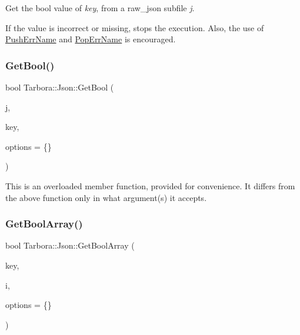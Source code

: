 Get the bool value of {\itshape key}, from a raw\+\_\+json subfile {\itshape j}. 

If the value is incorrect or missing, stops the execution. Also, the use of \hyperlink{classTarbora_1_1Json_a061eac4f16dac3b9b3a26a66de0ea8f0}{Push\+Err\+Name} and \hyperlink{classTarbora_1_1Json_a14019f06d3bd76edd6a6e78134519d11}{Pop\+Err\+Name} is encouraged. \mbox{\label{classTarbora_1_1Json_a9767d7711293215321d6e962ecd69654}} 
\subsubsection{\texorpdfstring{Get\+Bool()}{GetBool()}\hspace{0.1cm}{\footnotesize\ttfamily [3/3]}}
{\footnotesize\ttfamily bool Tarbora\+::\+Json\+::\+Get\+Bool (\begin{DoxyParamCaption}\item[{raw\+\_\+json}]{j,  }\item[{int}]{key,  }\item[{\hyperlink{structTarbora_1_1JsonOptions}{Json\+Options}}]{options = {\ttfamily \{\}} }\end{DoxyParamCaption})}

This is an overloaded member function, provided for convenience. It differs from the above function only in what argument(s) it accepts. \mbox{\label{classTarbora_1_1Json_acfc1e64adfc651164491f33938054435}} 
\subsubsection{\texorpdfstring{Get\+Bool\+Array()}{GetBoolArray()}\hspace{0.1cm}{\footnotesize\ttfamily [1/2]}}
{\footnotesize\ttfamily bool Tarbora\+::\+Json\+::\+Get\+Bool\+Array (\begin{DoxyParamCaption}\item[{const char $\ast$}]{key,  }\item[{int}]{i,  }\item[{\hyperlink{structTarbora_1_1JsonOptions}{Json\+Options}}]{options = {\ttfamily \{\}} }\end{DoxyParamCaption})}




